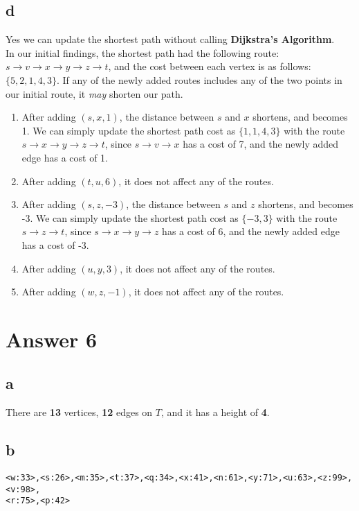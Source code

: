 \documentclass[11pt]{article}
\begin{document}
\subsection*{d}
Yes we can update the shortest path without calling \textbf{Dijkstra's Algorithm}. \\
In our initial findings, the shortest path had the following route: $ s \rightarrow v \rightarrow x \rightarrow y \rightarrow z \rightarrow t$, and the cost between each vertex is as follows: $ \{ 5,2,1,4,3 \}$.  If any of the newly added routes includes any of the two points in our initial route, it \textit{may} shorten our path.
\begin{enumerate}
    \item After adding $(s,x,1)$, the distance between $s$ and $x$ shortens, and becomes 1. We can simply update the shortest path cost as $ \{ 1,1,4,3 \}$ with the route $ s  \rightarrow x \rightarrow y \rightarrow z \rightarrow t$, since $s \rightarrow v \rightarrow x$ has a cost of 7, and the newly added edge has a cost of 1. 
    \item After adding $(t,u,6)$, it does not affect any of the routes.
    \item After adding $(s,z,-3)$, the distance between $s$ and $z$ shortens, and becomes -3. We can simply update the shortest path cost as $ \{ -3,3 \}$ with the route $ s  \rightarrow z \rightarrow t$, since $s  \rightarrow x \rightarrow y \rightarrow z $ has a cost of 6, and the newly added edge has a cost of -3. 
    \item After adding $(u,y,3)$, it does not affect any of the routes.
    \item After adding $(w,z,-1)$, it does not affect any of the routes.
\end{enumerate}

\section*{Answer 6}
\subsection*{a}
There are \textbf{13} vertices, \textbf{12} edges on $T$, and it has a height of \textbf{4}.
\subsection*{b}
\texttt{<w:33>,<s:26>,<m:35>,<t:37>,<q:34>,<x:41>,<n:61>,<y:71>,<u:63>,<z:99>,<v:98>,\\ <r:75>,<p:42>}
\end{document}
